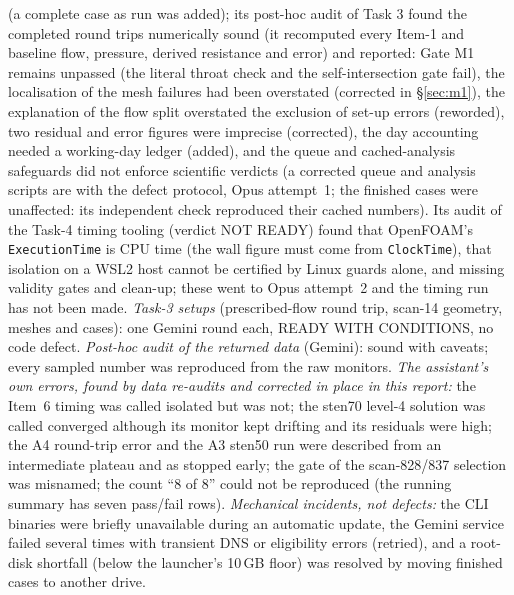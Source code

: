 \documentclass[11pt]{article}
\begin{document}
(a complete case as run was added); its post-hoc audit of Task 3 found the completed round trips numerically sound (it recomputed every Item-1 and baseline flow, pressure, derived resistance and error) and reported: Gate M1 remains unpassed (the literal throat check and the self-intersection gate fail), the localisation of the mesh failures had been overstated (corrected in \S\ref{sec:m1}), the explanation of the flow split overstated the exclusion of set-up errors (reworded), two residual and error figures were imprecise (corrected), the day accounting needed a working-day ledger (added), and the queue and cached-analysis safeguards did not enforce scientific verdicts (a corrected queue and analysis scripts are with the defect protocol, Opus attempt~1; the finished cases were unaffected: its independent check reproduced their cached numbers). Its audit of the Task-4 timing tooling (verdict NOT READY) found that OpenFOAM's \texttt{ExecutionTime} is CPU time (the wall figure must come from \texttt{ClockTime}), that isolation on a WSL2 host cannot be certified by Linux guards alone, and missing validity gates and clean-up; these went to Opus attempt~2 and the timing run has not been made. \emph{Task-3 setups} (prescribed-flow round trip, scan-14 geometry, meshes and cases): one Gemini round each, READY WITH CONDITIONS, no code defect. \emph{Post-hoc audit of the returned data} (Gemini): sound with caveats; every sampled number was reproduced from the raw monitors. \emph{The assistant's own errors, found by data re-audits and corrected in place in this report:} the Item~6 timing was called isolated but was not; the sten70 level-4 solution was called converged although its monitor kept drifting and its residuals were high; the A4 round-trip error and the A3 sten50 run were described from an intermediate plateau and as stopped early; the gate of the scan-828/837 selection was misnamed; the count ``8 of 8'' could not be reproduced (the running summary has seven pass/fail rows). \emph{Mechanical incidents, not defects:} the CLI binaries were briefly unavailable during an automatic update, the Gemini service failed several times with transient DNS or eligibility errors (retried), and a root-disk shortfall (below the launcher's 10\,GB floor) was resolved by moving finished cases to another drive.
\end{document}
